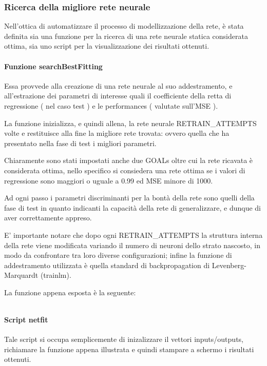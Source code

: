 \subsubsection{Ricerca della migliore rete neurale}
Nell'ottica di automatizzare il processo di modellizzazione della rete, è stata definita sia una funzione per la ricerca di una rete neurale statica considerata ottima, sia uno script per la visualizzazione dei risultati ottenuti.

\paragraph{Funzione searchBestFitting}
Essa provvede alla creazione di una rete neurale al suo addestramento, e all'estrazione dei parametri di interesse quali il coefficiente della retta di regressione ( nel caso test ) e le performances ( valutate sull'MSE ).

La funzione inizializza, e quindi allena, la rete neurale RETRAIN\_ATTEMPTS volte e restituisce alla fine la migliore rete trovata: ovvero quella che ha presentato nella fase di test i migliori parametri.

Chiaramente sono stati impostati anche due GOALs oltre cui la rete ricavata è considerata ottima, nello specifico si consiedera una rete ottima se i valori di regressione sono maggiori o uguale a 0.99 ed MSE minore di 1000.

Ad ogni passo i parametri discriminanti per la bontà della rete sono quelli della fase di test in quanto indicanti la capacità della rete di generalizzare, e dunque di aver correttamente appreso.

E' importante notare che dopo ogni RETRAIN\_ATTEMPTS la struttura interna della rete viene modificata variando il numero di neuroni dello strato nascosto, in modo da confrontare tra loro diverse configurazioni; infine la funzione di addestramento utilizzata è quella standard di backpropagation di Levenberg-Marquardt (trainlm).

La funzione appena esposta è la seguente:

\inputminted[linenos=true,fontsize=\footnotesize]{matlab}{../../src/neural\ network/functions/searchBestFitting.m}


\paragraph{Script netfit}
Tale script si occupa semplicemente di inizalizzare il vettori inputs/outputs, richiamare la funzione appena illustrata e quindi stampare a schermo i risultati ottenuti.

